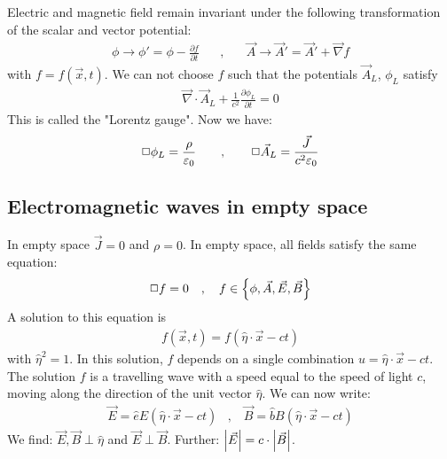 Electric and magnetic field remain invariant under the following transformation
of the scalar and vector potential:
\begin{align*}
    \phi \rightarrow \phi' = \phi - \frac{\partial f}{\partial t}
    \hspace{20pt} , \hspace{20pt}
    \vec{A} \rightarrow \vec{A}' = \vec{A}' + \vec{\nabla} f
\end{align*}
with $f = f(\vec{x},t)$. We can not choose $f$ such that the potentials
$\vec{A}_L$, $\phi_L$ satisfy
\begin{align*}
    \vec{\nabla} \cdot \vec{A}_L + \frac{1}{c^2} \frac{\partial \phi_L}{\partial t} = 0
\end{align*}
This is called the "Lorentz gauge". Now we have:
\begin{align*}
    \Box \phi_L = \frac{\rho}{\varepsilon_0}
    \hspace{20pt} , \hspace{20pt}
    \Box \vec{A}_L = \frac{\vec{J}}{c^2 \varepsilon_0}
\end{align*}

\subsection{Electromagnetic waves in empty space}

In empty space $\vec{J} = 0$ and $\rho = 0$. In empty space, all fields
satisfy the same equation:
\begin{align*}
    \Box f = 0
    \hspace{10pt} , \hspace{10pt}
    f \in \left\{ \phi,\vec{A},\vec{E},\vec{B} \right\}
\end{align*}
A solution to this equation is
\begin{align*}
    f(\vec{x},t) = f(\hat{\eta} \cdot \vec{x} - c t)
\end{align*}
with $\hat{\eta}^2 = 1$. In this solution, $f$ depends on a single
combination $u = \hat{\eta} \cdot \vec{x} - c t$. The solution $f$ is
a travelling wave with a speed equal to the speed of light $c$, moving
along the direction of the unit vector $\hat{\eta}$. We can now write:
\begin{align*}
    \vec{E} = \hat{e} E (\hat{\eta} \cdot \vec{x} - c t)
    \hspace{10pt} , \hspace{10pt}
    \vec{B} = \hat{b} B (\hat{\eta} \cdot \vec{x} - c t)
\end{align*}
We find: $\vec{E},\vec{B} \perp \hat{\eta}$ and $\vec{E} \perp \vec{B}$.
Further: $\left\vert \vec{E} \right\vert = c \cdot \left\vert \vec{B} \right\vert$.

